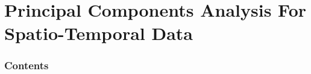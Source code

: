 \section[PCA/EOF]{Principal Components Analysis For
  Spatio-Temporal Data}

\hidenum
\begin{frame}[noframenumbering]
\frametitle{Contents}
 \tableofcontents[currentsection,hideothersubsections,sectionstyle=show/hide]
\end{frame}
\shownum





